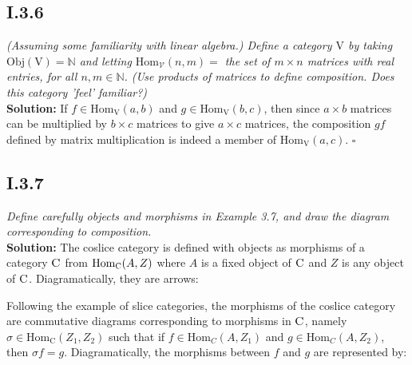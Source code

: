 \documentclass[11pt,a4paper]{article}
\newcommand{\morph}[3]{\text{Hom}_{#1}(#2,#3)}
\begin{document}
\subsection*{I.3.6} \textit{(Assuming some familiarity with linear algebra.) Define a category $\text{V}$ by taking $\text{Obj}(\text{V}) = \mathbb{N}$ and letting $\text{Hom}_{\mathscr{V}}(n,m) =$ the set of $m \times n$ matrices with real entries, for all $n,m \in \mathbb{N}$. (Use products of matrices to define composition.  Does this category 'feel' familiar?)} \\

\noindent \textbf{Solution: } If $f \in \text{Hom}_{\text{V}}(a,b)$ and $g \in \text{Hom}_{\text{V}}(b,c)$, then since $a \times b$ matrices can be multiplied by $b \times c$ matrices to give $a \times c$ matrices, the composition $gf$ defined by matrix multiplication is indeed a member of $\text{Hom}_{\text{V}}(a,c)$. $\square$

\subsection*{I.3.7}\textit{Define carefully objects and morphisms in Example 3.7, and draw the diagram corresponding to composition.} \\

\noindent\textbf{Solution: }  The coslice category is defined with objects as morphisms of a category $\textsc{C}$ from $\text{Hom}_{\textsc{C}}(A,Z)$ where $A$ is a fixed object of $\textsc{C}$ and $Z$ is any object of $\textsc{C}$.  Diagramatically, they are arrows:

\begin{center}
\end{center}

\noindent Following the example of slice categories, the morphisms of the coslice category are commutative diagrams corresponding to morphisms in $\textsc{C}$, namely $\sigma \in \text{Hom}_{\text{C}}(Z_1, Z_2)$ such that if $f \in \morph{C}{A}{Z_1}$ and $g \in \morph{C}{A}{Z_2}$, then $\sigma f = g$. Diagramatically, the morphisms between $f$ and $g$ are represented by:

\begin{center}
\end{center}
\end{document}
